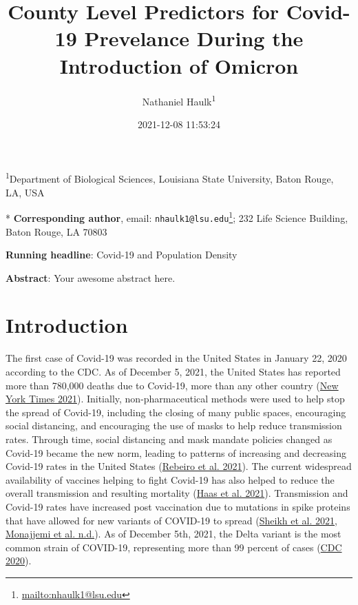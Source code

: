 \documentclass[
  12pt,
]{article}
\title{County Level Predictors for Covid-19 Prevelance During the Introduction of Omicron}
\author{Nathaniel Haulk\textsuperscript{1}}
\date{2021-12-08 11:53:24}
\DeclareRobustCommand{\href}[2]{#2\footnote{\url{#1}}}
\begin{document}
\maketitle

\renewcommand{\figurename}{{\textbf{Figure}}}
\renewcommand{\tablename}{{\textbf{Table}}}

\footnotesize

\textsuperscript{1}Department of Biological Sciences, Louisiana State University, Baton Rouge, LA, USA

* \textbf{Corresponding author}, email: \href{mailto:nhaulk1@lsu.edu}{\nolinkurl{nhaulk1@lsu.edu}}; 232 Life Science Building, Baton Rouge, LA 70803

\normalsize

\textbf{Running headline}: Covid-19 and Population Density

\textbf{Abstract}: Your awesome abstract here.

\clearpage

\hypertarget{introduction}{%
\section{Introduction}\label{introduction}}

The first case of Covid-19 was recorded in the United States in January 22, 2020 according to the CDC. As of December 5, 2021, the United States has reported more than 780,000 deaths due to Covid-19, more than any other country (\protect\hyperlink{ref-new_york_times_coronavirus_2021}{New York Times 2021}). Initially, non-pharmaceutical methods were used to help stop the spread of Covid-19, including the closing of many public spaces, encouraging social distancing, and encouraging the use of masks to help reduce transmission rates. Through time, social distancing and mask mandate policies changed as Covid-19 became the new norm, leading to patterns of increasing and decreasing Covid-19 rates in the United States (\protect\hyperlink{ref-rebeiro_impact_2021}{Rebeiro et al. 2021}). The current widespread availability of vaccines helping to fight Covid-19 has also helped to reduce the overall transmission and resulting mortality (\protect\hyperlink{ref-haas_infections_2021}{Haas et al. 2021}). Transmission and Covid-19 rates have increased post vaccination due to mutations in spike proteins that have allowed for new variants of COVID-19 to spread (\protect\hyperlink{ref-sheikh_sars-cov-2_2021}{Sheikh et al. 2021}, \protect\hyperlink{ref-monajjemi_delta_nodate}{Monajjemi et al. n.d.}). As of December 5th, 2021, the Delta variant is the most common strain of COVID-19, representing more than 99 percent of cases (\protect\hyperlink{ref-cdc_covid_2020}{CDC 2020}).
\end{document}
